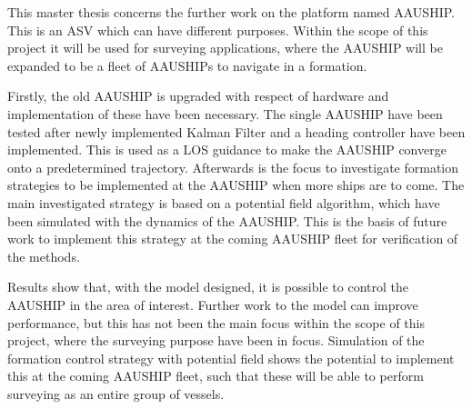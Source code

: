 This master thesis concerns the further work on the platform named
AAUSHIP. This is an \acf{ASV} which can have different
purposes.  Within the scope of this project it will be used for
surveying applications, where the AAUSHIP will be expanded to be a
fleet of AAUSHIPs to navigate in a formation.

Firstly, the old
AAUSHIP is upgraded with respect of hardware and implementation of these
have been necessary. The single AAUSHIP have been tested after newly
implemented Kalman Filter and a heading controller have been
implemented. This is used as a \acf{LOS} guidance to make the AAUSHIP
converge onto a predetermined trajectory. Afterwards is the focus to
investigate formation strategies to be implemented at the AAUSHIP when
more ships are to come. The main investigated strategy is based on a
potential field algorithm, which have been simulated with the dynamics
of the AAUSHIP. This is the basis of future work to implement this
strategy at the coming AAUSHIP fleet for verification of the methods.

Results show that, with the model designed, it is possible to control
the AAUSHIP in the area of interest. Further work to the model can
improve performance, but this has not been the main focus within the
scope of this project, where the surveying purpose have been in
focus. Simulation of the formation control strategy with potential
field shows the potential to implement this at the coming AAUSHIP
fleet, such that these will be able to perform surveying as an entire
group of vessels.
